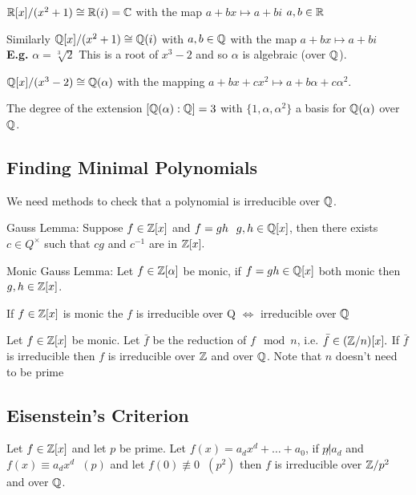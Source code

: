 \documentclass[11pt]{article}
\begin{document}
$ \mathbb{R}[x] /(x^2 + 1) \cong \mathbb{R}(i) = \mathbb{C}$ with the map $a+bx \mapsto a+bi $ $a,b \in \mathbb{R}$

$ $\\[1em]
Similarly $\mathbb{Q}[x] /(x^2 + 1) \cong \mathbb{Q}(i) $ with $a,b \in \mathbb{Q}$ with the map $ a+bx \mapsto a+bi$
$ $\\[1em]
\textbf{E.g.} $\alpha = \sqrt[3]{2}$ This is a root of $x^3 - 2$ and so $\alpha$ is algebraic (over $\mathbb{Q}$).

$\mathbb{Q}[x] / (x^3 -2 ) \cong \mathbb{Q}(\alpha) $ with the mapping $a+bx+cx^2 \mapsto a+b\alpha + c\alpha^2$.

The degree of the extension $[\mathbb{Q}(\alpha) : \mathbb{Q}] = 3$ with $\{1,\alpha, \alpha^2 \}$ a basis for $\mathbb{Q}(\alpha)$ over $\mathbb{Q}$.

\subsection{Finding Minimal Polynomials}
We need methods to check that a polynomial is irreducible over $\mathbb{Q}$.

\begin{lemma}
	Gauss Lemma: Suppose $f \in \mathbb{Z}[x]$ and $f=gh \hspace{7pt} g,h \in \mathbb{Q}[x] $, then there exists $c \in Q^\times $ such that $cg$ and $c^{-1} $ are in $\mathbb{Z}[x].$
\end{lemma}

\begin{lemma}
	Monic Gauss Lemma: Let $f \in \mathbb{Z}[\alpha]$ be monic, if $f=gh \in \mathbb{Q}[x]$ both monic then $g,h \in \mathbb{Z}[x]$.
\end{lemma}
\begin{cor}
	If $f \in \mathbb{Z}[x] $ is monic the $f$ is irreducible over Q $\iff $ irreducible over $\mathbb{Q}$
\end{cor}

\begin{cor}
	Let $f \in \mathbb{Z}[x]$ be monic.
	Let $\bar f$ be the reduction of $f \mod n $, i.e. $\bar f \in (\mathbb{Z} / n)[x].$
	If $\bar f$ is irreducible then $f$ is irreducible over $\mathbb{Z}$ and over $\mathbb{Q}$.
	Note that $n$ doesn't need to be prime
\end{cor}


\subsection{Eisenstein's Criterion}
 Let $f \in \mathbb{Z}[x]$ and let $p$ be prime.
Let $f(x) = a_dx^d+ \dots + a_0$, if $p \not | a_d $ and $f(x) \equiv a_dx^d \hspace{7pt} (p)$ and let $ f(0) \not \equiv 0 \hspace{7pt} (p^2) $ then $f $ is irreducible over $\mathbb{Z}/p^2 $ and over $\mathbb{Q}$.
\end{document}
